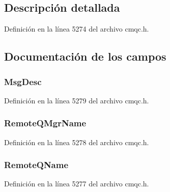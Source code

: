 \subsection{Descripción detallada}


Definición en la línea 5274 del archivo cmqc.\+h.



\subsection{Documentación de los campos}
\hypertarget{structtag_m_q_x_q_h_a93e5134b6847bf9a3ce68202e2c952e4}{}
\subsubsection[{Msg\+Desc}]{ Msg\+Desc}\label{structtag_m_q_x_q_h_a93e5134b6847bf9a3ce68202e2c952e4}


Definición en la línea 5279 del archivo cmqc.\+h.

\hypertarget{structtag_m_q_x_q_h_a78e0e0316b33b8ed1d4bddb56f5dabe8}{}
\subsubsection[{Remote\+Q\+Mgr\+Name}]{ Remote\+Q\+Mgr\+Name}\label{structtag_m_q_x_q_h_a78e0e0316b33b8ed1d4bddb56f5dabe8}


Definición en la línea 5278 del archivo cmqc.\+h.

\hypertarget{structtag_m_q_x_q_h_aeadc62f8e5e3d5887d599a5879458a92}{}
\subsubsection[{Remote\+Q\+Name}]{ Remote\+Q\+Name}\label{structtag_m_q_x_q_h_aeadc62f8e5e3d5887d599a5879458a92}


Definición en la línea 5277 del archivo cmqc.\+h.

